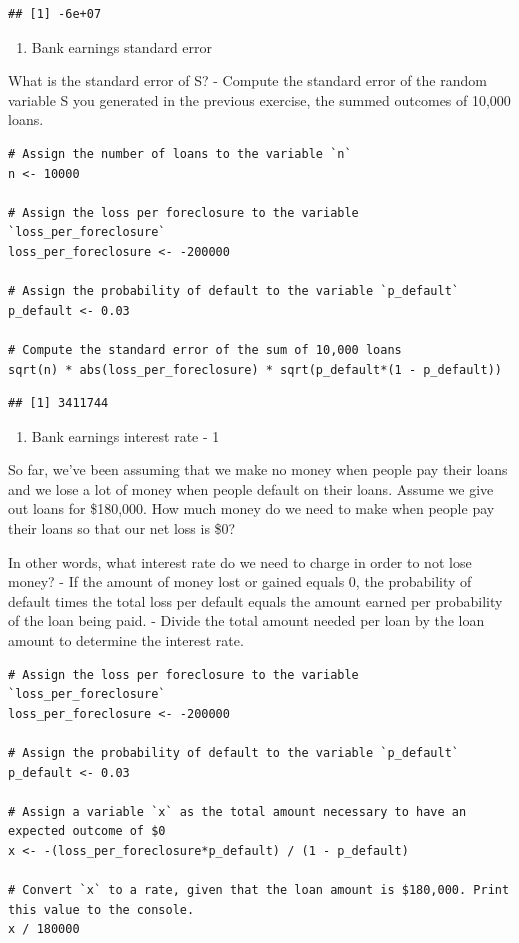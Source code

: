 \documentclass[
]{article}
\providecommand{\tightlist}{%
  \setlength{\itemsep}{0pt}\setlength{\parskip}{0pt}}
\begin{document}
\begin{verbatim}
## [1] -6e+07
\end{verbatim}

\begin{enumerate}
\def\labelenumi{\arabic{enumi}.}
\setcounter{enumi}{3}
\tightlist
\item
  Bank earnings standard error
\end{enumerate}

What is the standard error of S? - Compute the standard error of the
random variable S you generated in the previous exercise, the summed
outcomes of 10,000 loans.

\begin{verbatim}
# Assign the number of loans to the variable `n`
n <- 10000

# Assign the loss per foreclosure to the variable `loss_per_foreclosure`
loss_per_foreclosure <- -200000

# Assign the probability of default to the variable `p_default`
p_default <- 0.03

# Compute the standard error of the sum of 10,000 loans
sqrt(n) * abs(loss_per_foreclosure) * sqrt(p_default*(1 - p_default))
\end{verbatim}

\begin{verbatim}
## [1] 3411744
\end{verbatim}

\begin{enumerate}
\def\labelenumi{\arabic{enumi}.}
\setcounter{enumi}{4}
\tightlist
\item
  Bank earnings interest rate - 1
\end{enumerate}

So far, we've been assuming that we make no money when people pay their
loans and we lose a lot of money when people default on their loans.
Assume we give out loans for \$180,000. How much money do we need to
make when people pay their loans so that our net loss is \$0?

In other words, what interest rate do we need to charge in order to not
lose money? - If the amount of money lost or gained equals 0, the
probability of default times the total loss per default equals the
amount earned per probability of the loan being paid. - Divide the total
amount needed per loan by the loan amount to determine the interest
rate.

\begin{verbatim}
# Assign the loss per foreclosure to the variable `loss_per_foreclosure`
loss_per_foreclosure <- -200000

# Assign the probability of default to the variable `p_default`
p_default <- 0.03

# Assign a variable `x` as the total amount necessary to have an expected outcome of $0
x <- -(loss_per_foreclosure*p_default) / (1 - p_default)

# Convert `x` to a rate, given that the loan amount is $180,000. Print this value to the console.
x / 180000
\end{verbatim}
\end{document}
